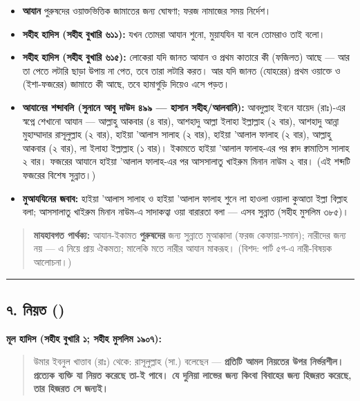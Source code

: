 \begin{itemize}
\item \textbf{আযান} পুরুষদের ওয়াক্তভিত্তিক জামাতের জন্য ঘোষণা; ফরজ নামাজের সময় নির্দেশ।
\item \textbf{সহীহ হাদিস (সহীহ বুখারি ৬১১):} যখন তোমরা আযান শুনো, মুয়াযযিন যা বলে তোমরাও তাই বলো।
\item \textbf{সহীহ হাদিস (সহীহ বুখারি ৬১৫):} লোকেরা যদি জানত আযান ও প্রথম কাতারে কী (ফজিলত) আছে — আর তা পেতে লটারি ছাড়া উপায় না পেত, তবে তারা লটারি করত। আর যদি জানত (যোহরের) প্রথম ওয়াক্তে ও (ইশা-ফজরের) জামাতে কী আছে, তবে হামাগুড়ি দিয়েও এসে পড়ত।
\item \textbf{আযানের শব্দাবলি (সুনানে আবু দাউদ ৪৯৯ — হাসান সহীহ/আলবানি):} আবদুল্লাহ ইবনে যায়েদ (রাঃ)-এর স্বপ্নে শেখানো আযান — আল্লাহু আকবার (৪ বার), আশহাদু আল্লা ইলাহা ইল্লাল্লাহ (২ বার), আশহাদু আন্না মুহাম্মাদার রাসূলুল্লাহ (২ বার), হাইয়া 'আলাস সালাহ (২ বার), হাইয়া 'আলাল ফালাহ (২ বার), আল্লাহু আকবার (২ বার), লা ইলাহা ইল্লাল্লাহ (১ বার)। ইকামতে হাইয়া 'আলাল ফালাহ-এর পর ক্বাদ ক্বামাতিস সালাহ ২ বার। ফজরের আযানে হাইয়া 'আলাল ফালাহ-এর পর আসসালাতু খাইরুম মিনান নাউম ২ বার। (এই শব্দটি ফজরের বিশেষ সুন্নাত।)
\item \textbf{মুআযযিনের জবাব:} হাইয়া 'আলাস সালাহ ও হাইয়া 'আলাল ফালাহ শুনে লা হাওলা ওয়ালা কুআতা ইল্লা বিল্লাহ বলা; আসসালাতু খাইরুম মিনান নাউম-এ সাদাকত্বা ওয়া বারারতা বলা — এসব সুন্নাত (সহীহ মুসলিম ৩৮৫)।
\end{itemize}
\begin{quote}
\textbf{মাযহাবগত পার্থক্য:} আযান-ইকামত \textbf{পুরুষদের} জন্য সুন্নাতে মুআক্কাদা (ফরজ কেফায়া-সমান); নারীদের জন্য নয় — এ নিয়ে প্রায় ঐকমত্য; মালেকি মতে নারীর আযান মাকরূহ। (বিশদ: পার্ট ৫গ-এ নারী-বিষয়ক আলোচনা।)
\end{quote}

\medskip\hrule\medskip

\subsection*{৭. নিয়ত ()}

\textbf{মূল হাদিস (সহীহ বুখারি ১; সহীহ মুসলিম ১৯০৭):}

\begin{quote}
উমার ইবনুল খাত্তাব (রাঃ) থেকে: রাসূলুল্লাহ (সা.) বলেছেন — \textbf{প্রতিটি আমল নিয়তের উপর নির্ভরশীল। প্রত্যেক ব্যক্তি যা নিয়ত করেছে তা-ই পাবে। যে দুনিয়া লাভের জন্য কিংবা বিবাহের জন্য হিজরত করেছে, তার হিজরত সে জন্যই।}
\end{quote}

